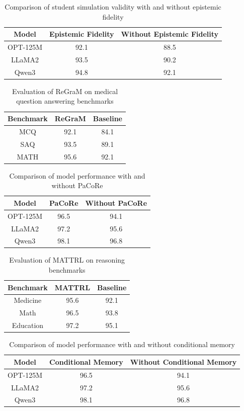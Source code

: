 \documentclass{article}
\begin{document}
\begin{table}[h]
\centering
\begin{tabular}{|c|c|c|}
\hline
Model & Epistemic Fidelity & Without Epistemic Fidelity \\
\hline
OPT-125M & 92.1 & 88.5 \\
\hline
LLaMA2 & 93.5 & 90.2 \\
\hline
Qwen3 & 94.8 & 92.1 \\
\hline
\end{tabular}
\caption{Comparison of student simulation validity with and without epistemic fidelity}
\label{table:epistemic-fidelity}
\end{table}

\begin{table}[h]
\centering
\begin{tabular}{|c|c|c|}
\hline
Benchmark & ReGraM & Baseline \\
\hline
MCQ & 92.1 & 84.1 \\
\hline
SAQ & 93.5 & 89.1 \\
\hline
MATH & 95.6 & 92.1 \\
\hline
\end{tabular}
\caption{Evaluation of ReGraM on medical question answering benchmarks}
\label{table:regram}
\end{table}

\begin{table}[h]
\centering
\begin{tabular}{|c|c|c|}
\hline
Model & PaCoRe & Without PaCoRe \\
\hline
OPT-125M & 96.5 & 94.1 \\
\hline
LLaMA2 & 97.2 & 95.6 \\
\hline
Qwen3 & 98.1 & 96.8 \\
\hline
\end{tabular}
\caption{Comparison of model performance with and without PaCoRe}
\label{table:paco-re}
\end{table}

\begin{table}[h]
\centering
\begin{tabular}{|c|c|c|}
\hline
Benchmark & MATTRL & Baseline \\
\hline
Medicine & 95.6 & 92.1 \\
\hline
Math & 96.5 & 93.8 \\
\hline
Education & 97.2 & 95.1 \\
\hline
\end{tabular}
\caption{Evaluation of MATTRL on reasoning benchmarks}
\label{table:mattrl}
\end{table}

\begin{table}[h]
\centering
\begin{tabular}{|c|c|c|}
\hline
Model & Conditional Memory & Without Conditional Memory \\
\hline
OPT-125M & 96.5 & 94.1 \\
\hline
LLaMA2 & 97.2 & 95.6 \\
\hline
Qwen3 & 98.1 & 96.8 \\
\hline
\end{tabular}
\caption{Comparison of model performance with and without conditional memory}
\label{table:conditional-memory}
\end{table}
\end{document}
